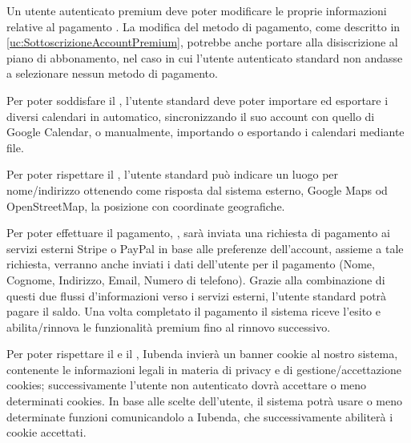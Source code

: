 \begin{listaPersonale}[DCO]{}
    Un utente autenticato premium deve poter modificare le proprie informazioni relative al pagamento . La modifica del metodo di pagamento, come descritto in \ref{uc:SottoscrizioneAccountPremium}, potrebbe anche portare alla disiscrizione al piano di abbonamento, nel caso in cui l'utente autenticato standard non andasse a selezionare nessun metodo di pagamento.

    Per poter soddisfare il , l'utente standard deve poter importare ed esportare i diversi calendari in automatico, sincronizzando il suo account con quello di Google Calendar, o manualmente, importando o esportando i calendari mediante file.

    Per poter rispettare il , l'utente standard può indicare un luogo per nome/indirizzo ottenendo come risposta dal sistema esterno, Google Maps od OpenStreetMap, la posizione con coordinate geografiche.

    Per poter effettuare il pagamento, , sarà inviata una richiesta di pagamento ai servizi esterni Stripe o PayPal in base alle preferenze dell'account, assieme a tale richiesta, verranno anche inviati i dati dell'utente per il pagamento (Nome, Cognome, Indirizzo, Email, Numero di telefono). Grazie alla combinazione di questi due flussi d'informazioni verso i servizi esterni, l'utente standard potrà pagare il saldo. Una volta completato il pagamento il sistema riceve l'esito e abilita/rinnova le funzionalità premium fino al rinnovo successivo.

    Per poter rispettare il  e il , Iubenda invierà un banner cookie al nostro sistema, contenente le informazioni legali in materia di privacy e di gestione/accettazione cookies; successivamente l'utente non autenticato dovrà accettare o meno determinati cookies. In base alle scelte dell'utente, il sistema potrà usare o meno determinate funzioni comunicandolo a Iubenda, che successivamente abiliterà i cookie accettati.

\end{listaPersonale}
